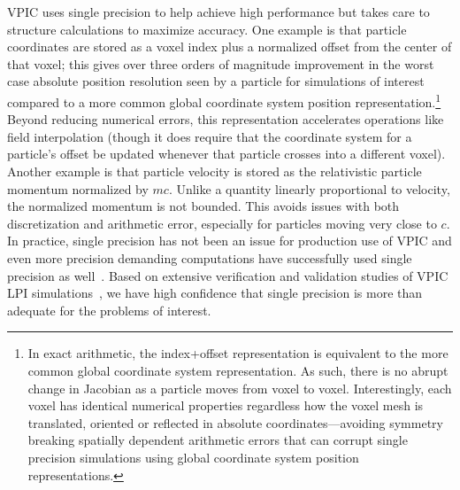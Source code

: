 \documentclass[journal,twoside]{IEEEtran}
\begin{document}
VPIC uses single precision to help achieve high performance but takes
care to structure calculations to maximize accuracy.  One example is
that particle coordinates are stored as a voxel index plus a
normalized offset from the center of that voxel; this gives over three
orders of magnitude improvement in the worst case absolute position
resolution seen by a particle for simulations of interest compared to
a more common global coordinate system position
representation.\footnote{In exact arithmetic, the index+offset
representation is equivalent to the more common global coordinate
system representation.  As such, there is no abrupt change in Jacobian
as a particle moves from voxel to voxel.  Interestingly, each voxel
has identical numerical properties regardless how the voxel mesh is
translated, oriented or reflected in absolute coordinates---avoiding
symmetry breaking spatially dependent arithmetic errors that can
corrupt single precision simulations using global coordinate system
position representations.}  Beyond reducing numerical errors, this
representation accelerates operations like field interpolation (though
it does require that the coordinate system for a particle's offset be
updated whenever that particle crosses into a different voxel).
Another example is that particle velocity is stored as the
relativistic particle momentum normalized by $mc$.  Unlike a quantity
linearly proportional to velocity, the normalized momentum is not
bounded.  This avoids issues with both discretization and arithmetic
error, especially for particles moving very close to $c$.  In
practice, single precision has not been an issue for production use of
VPIC and even more precision demanding computations have successfully
used single precision as
well~\cite{Bowers_et_al_2006,Langou_et_al_2006,Lippert_et_al_2007}.
Based on extensive verification and validation studies of VPIC LPI
simulations~\cite{Yin_et_al_Phys_Plasmas_2006}, we have high
confidence that single precision is more than adequate for the
problems of interest.
\end{document}
